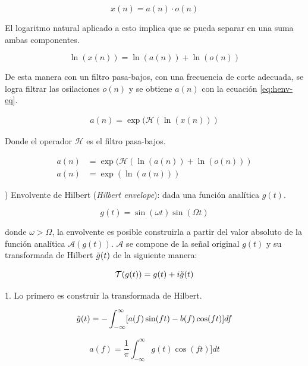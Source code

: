 \begin{equation}
    x(n) = a(n) \cdot o(n)
\end{equation}
                    
    El logaritmo natural aplicado a esto implica que se pueda separar en una suma ambas componentes.

\begin{equation}                    
    \ln(x(n)) = \ln(a(n)) + \ln(o(n))
\end{equation}    
    
    De esta manera con un filtro pasa-bajos, con una frecuencia de corte adecuada, se logra filtrar las osilaciones $o(n)$ y se obtiene $a(n)$ con la ecuación \ref{eq:henv-eq}.

\begin{align} \label{eq:henv-eq}
    a(n) = \exp(\mathcal{H}(\ln(x(n)))
\end{align}

Donde el operador $\mathcal{H}$ es el filtro pasa-bajos.

\begin{align*}
    a(n) &= \exp(\mathcal{H}(\ln(a(n)) + \ln(o(n))) \\
    a(n) &= \exp(\ln(a(n)))
\end{align*}

) Envolvente de Hilbert (\textit{Hilbert envelope}): dada una función analítica $g(t)$.

\begin{equation}
    g(t)=\sin(\omega t)\sin(\Omega t)
\end{equation}                   

    donde $\omega > \Omega$, la envolvente es posible construirla a partir del valor absoluto de la función analítica $\mathscr{A}(g(t))$. $\mathscr{A}$ se compone de la señal original $g(t)$ y su transformada de Hilbert $\Tilde{g}(t)$ de la siguiente manera:

\begin{equation}
    \mathcal{T}(g(t))=g(t) + i\Tilde{g}(t)
\end{equation}

    1. Lo primero es construir la transformada de Hilbert.

\begin{equation} \label{eq:hilbert_transform}
    \Tilde{g}(t)=-\int_{-\infty}^{\infty} [a(f)\sin(ft) - b(f)\cos(ft)]df
\end{equation}

\begin{equation}
    a(f)=\frac{1}{\pi}\int_{-\infty}^{\infty} g(t)\cos(ft)]dt
\end{equation}

